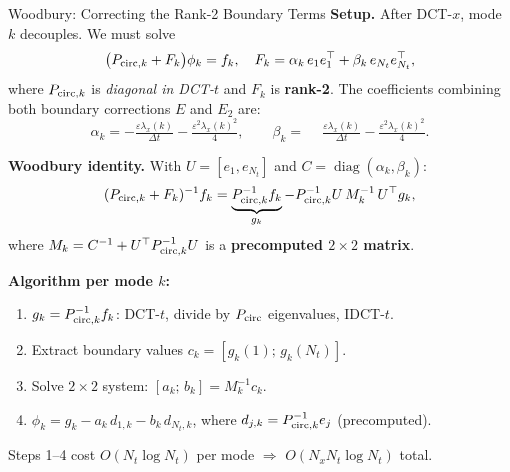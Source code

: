 \documentclass[10pt,aspectratio=169]{beamer}
\newcommand{\eps}{\varepsilon}
\newcommand{\lx}{\lambda_x}
\begin{document}
\begin{frame}{Woodbury: Correcting the Rank-2 Boundary Terms}
  \textbf{Setup.} After DCT-$x$, mode $k$ decouples. We must solve
  \[
    \bigl(P_{{\rm circ},k} + F_k\bigr)\phi_k = f_k,
    \quad
    F_k = \alpha_k\,e_1 e_1^\top + \beta_k\,e_{N_t}e_{N_t}^\top,
  \]
  where $P_{{\rm circ},k}$ is \emph{diagonal in DCT-$t$} and $F_k$ is \textbf{rank-2}.
  The coefficients combining both boundary corrections $E$ and $E_2$ are:
  \[
    \alpha_k = -\tfrac{\eps\lx(k)}{\Delta t} - \tfrac{\eps^2\lx(k)^2}{4},
    \qquad
    \beta_k  = \phantom{-}\tfrac{\eps\lx(k)}{\Delta t} - \tfrac{\eps^2\lx(k)^2}{4}.
  \]

  \textbf{Woodbury identity.} With $U=[e_1,e_{N_t}]$ and $C=\operatorname{diag}(\alpha_k,\beta_k)$:
  \[
    (P_{{\rm circ},k}+F_k)^{-1}f_k
    = \underbrace{P_{{\rm circ},k}^{-1}f_k}_{g_k}
      - P_{{\rm circ},k}^{-1}U\,M_k^{-1}\,U^\top g_k,
  \]
  where $M_k = C^{-1} + U^\top P_{{\rm circ},k}^{-1}U$ is a \textbf{precomputed $2{\times}2$ matrix}.

  \textbf{Algorithm per mode $k$:}
  \begin{enumerate}
    \item $g_k = P_{{\rm circ},k}^{-1}f_k$:\; DCT-$t$, divide by $P_{\rm circ}$ eigenvalues, IDCT-$t$.
    \item Extract boundary values $c_k = [g_k(1);\,g_k(N_t)]$.
    \item Solve $2{\times}2$ system: $[a_k;\,b_k] = M_k^{-1}c_k$.
    \item $\phi_k = g_k - a_k\,d_{1,k} - b_k\,d_{N_t,k}$,\quad
          where $d_{j,k} = P_{{\rm circ},k}^{-1}e_j$ (precomputed).
  \end{enumerate}
  Steps 1--4 cost $O(N_t\log N_t)$ per mode $\Rightarrow$ $O(N_xN_t\log N_t)$ total.
\end{frame}
\end{document}
